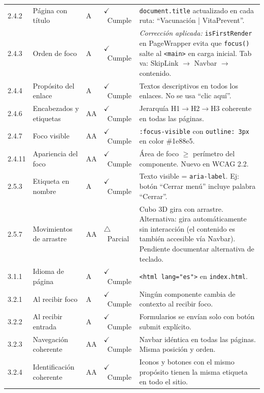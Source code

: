 \documentclass[12pt, a4paper]{report}
\newcommand{\cmark}{\textcolor{successgreen}{$\checkmark$}}
\newcommand{\wmark}{\textcolor{warningyellow}{$\triangle$}}
\begin{document}
\begin{longtable}{@{}>{\ttfamily\small}p{1.1cm} p{2.7cm} >{\centering\arraybackslash}p{0.8cm} >{\centering\arraybackslash\small}p{2.2cm} p{4.5cm}@{}}
2.4.2 & Página con título & A & \textcolor{successgreen}{\cmark~Cumple} & \texttt{document.title} actualizado en cada ruta: ``Vacunación | VitaPrevent''. \\
2.4.3 & Orden de foco & A & \textcolor{successgreen}{\cmark~Cumple} & \textit{Corrección aplicada:} \texttt{isFirstRender} en PageWrapper evita que \texttt{focus()} salte al \texttt{<main>} en carga inicial. Tab va: SkipLink $\rightarrow$ Navbar $\rightarrow$ contenido. \\
2.4.4 & Propósito del enlace & A & \textcolor{successgreen}{\cmark~Cumple} & Textos descriptivos en todos los enlaces. No se usa ``clic aquí''. \\
2.4.6 & Encabezados y etiquetas & AA & \textcolor{successgreen}{\cmark~Cumple} & Jerarquía H1$\to$H2$\to$H3 coherente en todas las páginas. \\
2.4.7 & Foco visible & AA & \textcolor{successgreen}{\cmark~Cumple} & \texttt{:focus-visible} con \texttt{outline: 3px} en color \#1e88e5. \\
2.4.11 & Apariencia del foco & AA & \textcolor{successgreen}{\cmark~Cumple} & Área de foco $\geq$ perímetro del componente. Nuevo en WCAG 2.2. \\
2.5.3 & Etiqueta en nombre & A & \textcolor{successgreen}{\cmark~Cumple} & Texto visible = \texttt{aria-label}. Ej: botón ``Cerrar menú'' incluye palabra ``Cerrar''. \\
2.5.7 & Movimientos de arrastre & AA & \textcolor{warningyellow}{\wmark~Parcial} & Cubo 3D gira con arrastre. Alternativa: gira automáticamente sin interacción (el contenido es también accesible vía Navbar). Pendiente documentar alternativa de teclado. \\
3.1.1 & Idioma de página & A & \textcolor{successgreen}{\cmark~Cumple} & \texttt{<html lang="es">} en \texttt{index.html}. \\
3.2.1 & Al recibir foco & A & \textcolor{successgreen}{\cmark~Cumple} & Ningún componente cambia de contexto al recibir foco. \\
3.2.2 & Al recibir entrada & A & \textcolor{successgreen}{\cmark~Cumple} & Formularios se envían solo con botón submit explícito. \\
3.2.3 & Navegación coherente & AA & \textcolor{successgreen}{\cmark~Cumple} & Navbar idéntica en todas las páginas. Misma posición y orden. \\
3.2.4 & Identificación coherente & AA & \textcolor{successgreen}{\cmark~Cumple} & Iconos y botones con el mismo propósito tienen la misma etiqueta en todo el sitio. \\

\end{longtable}
\end{document}
